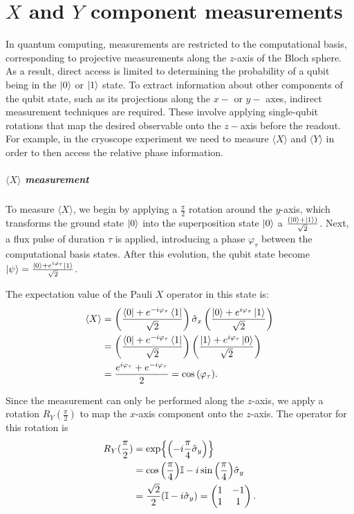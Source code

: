 \chapter{$X$ and $Y$ component measurements}
\label{app:AppendixD}

In quantum computing, measurements are restricted to the computational basis, corresponding to projective measurements along the $z$-axis of the Bloch sphere. 
As a result, direct access is limited to determining the probability of a qubit being in the $\ket{0}$ or $\ket{1}$ state.
To extract information about other components of the qubit state, such as its projections along the $x-$ or $y-$ axes, indirect measurement techniques are required. 
These involve applying single-qubit rotations that map the desired observable onto the $z-$axis before the readout.
For example, in the cryoscope experiment we need to measure $\langle X \rangle$ and $\langle Y \rangle$ in order to then access the relative phase information.
 
\paragraph{$\langle X \rangle$ measurement}
To measure $\langle X \rangle$, we begin by applying a $\frac{\pi}{2}$ rotation around the $y$-axis, which transforms the ground state $\ket{0}$ into the superposition state $\ket{0}$ a $\frac{(\ket{0} + \ket{1})}{\sqrt{2}}$.
Next, a flux pulse of duration $\tau$ is applied, introducing a phase $\varphi_\tau$ between the computational basis states. After this evolution, the qubit state become $\ket{\psi}=\frac{\ket{0} + e^{i\varphi_\tau} \ket{1}}{\sqrt{2}}$.

The expectation value of the Pauli $X$ operator in this state is:
\begin{align}
    \langle X \rangle &= \left( \frac{\bra{0} + e^{- i\varphi_\tau} \bra{1}}{\sqrt{2}} \right) \hat{\sigma}_x \left( \frac{\ket{0} + e^{ i \varphi_\tau} \ket{1}}{\sqrt{2}} \right)\\
    &= \left( \frac{\bra{0} + e^{- i \varphi_\tau} \bra{1}}{\sqrt{2}} \right)\left( \frac{\ket{1} + e^{ i \varphi_\tau} \ket{0}}{\sqrt{2}} \right)\\
    &= \frac{e^{ i \varphi_\tau} + e^{- i\varphi_\tau}}{2} = \cos{(\varphi_\tau)}.
\end{align}

Since the measurement can only be performed along the $z$-axis, we apply a rotation $R_Y(\frac{\pi}{2})$ to map the $x$-axis component onto the $z$-axis. The operator for this rotation is
\begin{align}\label{eq:RY90}
    R_Y(\frac{\pi}{2}) &= \exp{\left( -i\frac{\pi}{4}\hat{\sigma}_y\right)}\\
    &= \cos{\left(\frac{\pi}{4}\right)}\mathbb{I} - i\sin{\left(\frac{\pi}{4}\right)}\hat{\sigma}_y\\
    &= \frac{\sqrt{2}}{2}(\mathbb{I} -i\hat{\sigma}_y) = \begin{pmatrix}
        1 & -1 \\
        1 & 1
        \end{pmatrix}.
\end{align}

